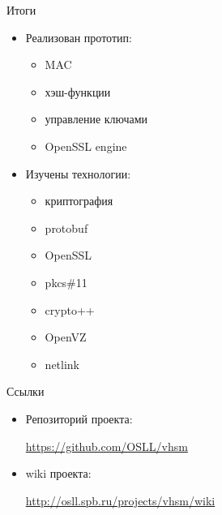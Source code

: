 \documentclass[utf8, 11pt]{beamer}
\begin{document}
\begin{frame}{Итоги}
\begin{itemize}
\item Реализован прототип:
	\begin{itemize}
		\item MAC
		\item хэш-функции
		\item управление ключами
		\item OpenSSL engine
	\end{itemize}
	
\item Изучены технологии:
	\begin{itemize}
		\item криптография
		\item protobuf
		\item OpenSSL
		\item pkcs\#11
		\item crypto++
		\item OpenVZ
		\item netlink
	\end{itemize}
	
\end{itemize}

\vspace*{\fill}

\end{frame}

\begin{frame}{Ссылки}
\begin{itemize}
\item Репозиторий проекта:

\url{https://github.com/OSLL/vhsm}

\item wiki проекта:

\url{http://osll.spb.ru/projects/vhsm/wiki}
\end{itemize}

\vspace*{\fill}

\end{frame}
\end{document}
